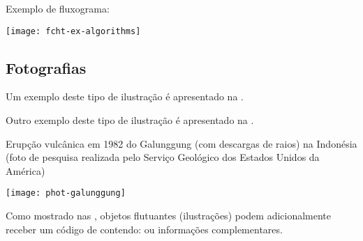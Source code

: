 \begin{flowchart}[!htbp]
\SetCaptionWidth{\textwidth}
\caption{Exemplo de fluxograma: }%
\label{fcht:ex-algorithms}
\texttt{[image: fcht-ex-algorithms]}
\end{flowchart}

\subsection{Fotografias}%
\label{ssect:phot}

Um exemplo deste tipo de ilustração é apresentado na .

\begin{photograph}[!htbp]
\caption[%
  Fachada do campus Ponta Grossa da UTFPR%
]{%
  Fachada do campus Ponta Grossa da %
}%
\label{phot:pg-campus}
%
\end{photograph}

Outro exemplo deste tipo de ilustração é apresentado na .

\begin{photograph}[!htbp]
\caption{Erupção vulcânica em 1982 do Galunggung (com descargas de raios) na Indonésia (foto de pesquisa realizada pelo Serviço Geológico dos Estados Unidos da América)}%
\label{phot:galunggung}
\texttt{[image: phot-galunggung]}%
\end{photograph}

Como mostrado nas , objetos flutuantes (ilustrações) podem adicionalmente receber um código de  contendo:  ou informações complementares.

